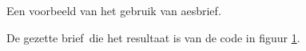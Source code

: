 \documentclass{article}
\newcommand\classnaam{aesbrief}%
\newcommand\classsf{\textsf{\classnaam}}
\newcommand\funktie{\aesnaam brief}%
\begin{document}
\begin{figure}[ht]
\centering
{}
\caption{Een voorbeeld van het gebruik van \classsf.}
\label{fig:code}
\end{figure}

\begin{figure}\begin{center}
\caption{De gezette \funktie \ die het resultaat is van de code in figuur \ref{fig:code}.}
\label{fig:brief}\end{center}
\end{figure}
\end{document}
